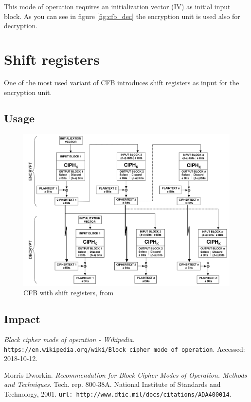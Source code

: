 \documentclass[11pt]{article}
\begin{document}
This mode of operation requires an initialization vector (IV) as initial input block. As you can see in figure \ref{fig:cfb_dec} the encryption unit is used also for decryption.

\section{Shift registers}

One of the most used variant of CFB introduces shift registers as input for the encryption unit.

\subsection{Usage}



\begin{figure}[!ht]
  \centering
  \includegraphics[width=1\textwidth]{pic3-hw1-1692419}
  \caption{CFB with shift registers, from \cite{nist}}
  \label{fig:cfb_shift}
\end{figure}

\subsection{Impact}



\newpage
\begin{thebibliography}{10}

{\em Block cipher mode of operation - Wikipedia}.
  \verb|https://en.wikipedia.org/wiki/Block_cipher_mode_of_operation|.
  \newblock Accessed: 2018-10-12.

Morris Dworkin.
  {\em Recommendation for Block Cipher Modes of Operation. Methods and Techniques}.
  Tech. rep. 800-38A. National Institute of Standards and Technology, 2001.
  \newblock \verb|url: http://www.dtic.mil/docs/citations/ADA400014|.

\end{thebibliography}
\end{document}
